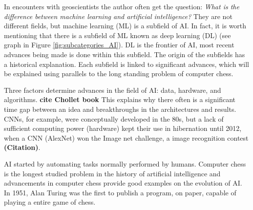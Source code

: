 \documentclass{article}
\begin{document}
In encounters with geoscientists the author often get the question: \textit{What is the difference between machine learning and artificial intelligence?} They are not different fields, but machine learning (ML) is a subfield of AI. In fact, it is worth mentioning that there is a subfield of ML known as deep learning (DL) (see graph in Figure \ref{fig:subcategories_AI}). DL is the frontier of AI, most recent advances being made is done within this subfield. %
The origin of the subfields has a historical explanation. Each subfield is linked to significant advances, which will be explained using parallels to the long standing problem of computer chess. 

Three factors determine advances in the field of AI: data, hardware, and algorithms. \textbf{cite Chollet book} This explains why there often is a significant time gap between an idea and breakthroughs in the architectures and results. CNNs, for example, were conceptually developed in the 80s, but a lack of sufficient computing power (hardware) kept their use in hibernation until 2012, when a CNN (AlexNet) won the Image net challenge, a image recognition contest \textbf{(Citation)}.

AI started by automating tasks normally performed by humans. Computer chess is the longest studied problem in the history of artificial intelligence and advancements in computer chess provide good examples on the evolution of AI. In 1951, Alan Turing was the first to publish a program, on paper, capable of playing a entire game of chess. 
\end{document}
